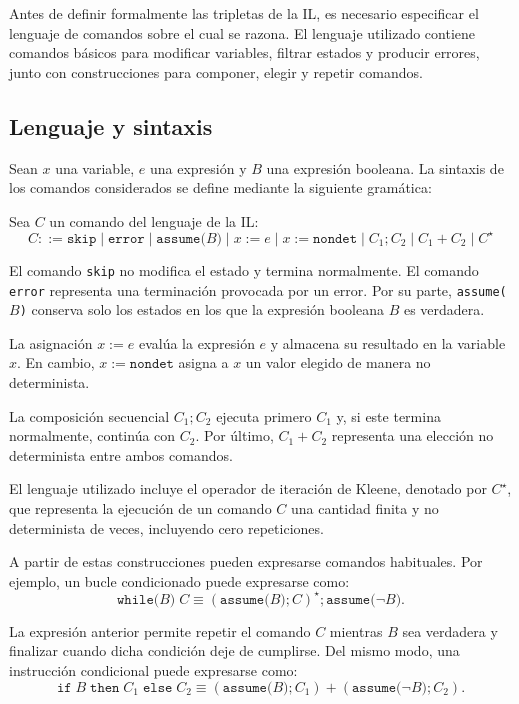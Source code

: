 \documentclass[a4paper,	11pt]{report}
\begin{document}
Antes de definir formalmente las tripletas de la IL,
es necesario especificar el lenguaje de comandos sobre el cual se razona.
El lenguaje utilizado contiene comandos básicos para modificar variables,
filtrar estados y producir errores,
junto con construcciones para componer, elegir y repetir comandos.

\subsection*{Lenguaje y sintaxis}
Sean $x$ una variable, $e$ una expresión y $B$ una expresión booleana.
La sintaxis de los comandos considerados se define mediante la siguiente gramática:

\begin{definicion}
Sea $C$ un comando del lenguaje de la IL:
$$C ::= \texttt{skip} \mid \texttt{error} \mid \texttt{assume(}B\texttt{)}
\mid x := e \mid x := \texttt{nondet} \mid C_1; C_2
\mid C_1 + C_2 \mid C^\star$$
\end{definicion}

El comando \texttt{skip} no modifica el estado y termina normalmente.
El comando \texttt{error} representa una terminación provocada por un error.
Por su parte, \texttt{assume(}$B$\texttt{)} conserva solo los estados en los que la expresión booleana $B$ es verdadera.

La asignación $x := e$ evalúa la expresión $e$ y almacena su resultado en la variable $x$.
En cambio, $x := \texttt{nondet}$ asigna a $x$ un valor elegido de manera no determinista.

La composición secuencial $C_1; C_2$ ejecuta primero $C_1$ y,
si este termina normalmente,
continúa con $C_2$.
Por último, $C_1 + C_2$ representa una elección no determinista entre ambos comandos.

El lenguaje utilizado incluye el operador de iteración de Kleene,
denotado por $C^\star$,
que representa la ejecución de un comando $C$ una cantidad finita y no determinista de veces,
incluyendo cero repeticiones.

A partir de estas construcciones pueden expresarse comandos habituales.
Por ejemplo,
un bucle condicionado puede expresarse como:
$$\texttt{while(}B\texttt{)} \; C \equiv \left(\texttt{assume(}B\texttt{)}; C\right)^\star; \texttt{assume(}\neg B\texttt{)}.$$

La expresión anterior permite repetir el comando $C$ mientras $B$ sea verdadera
y finalizar cuando dicha condición deje de cumplirse.
Del mismo modo,
una instrucción condicional puede expresarse como:
$$\texttt{if} \; B \; \texttt{then} \; C_1 \; \texttt{else} \; C_2 \equiv \left(\texttt{assume(}B\texttt{)}; C_1\right) +
\left(\texttt{assume(}\neg B\texttt{)}; C_2\right).$$
\end{document}

